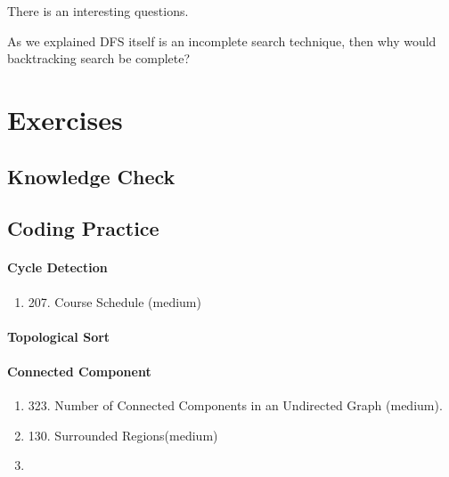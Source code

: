 \documentclass[../main.tex]{subfiles}
\begin{document}
 
 There is an interesting questions. 
\begin{bclogo}[couleur = blue!30, arrondi=0.1,logo=\bccrayon,ombre=true]{As we explained DFS itself is an incomplete search technique, then why would backtracking search be complete?} 
\end{bclogo} 
 



\section{Exercises}
\subsection{Knowledge Check}

\subsection{Coding Practice}
\paragraph{Cycle Detection}
\begin{enumerate}
    \item 207. Course Schedule (medium)
\end{enumerate}

\paragraph{Topological Sort}

\paragraph{Connected Component}
\begin{enumerate}
    \item 323. Number of Connected Components in an Undirected Graph (medium).
    \item 130. Surrounded Regions(medium)
    \item 
\end{enumerate}
\end{document}
